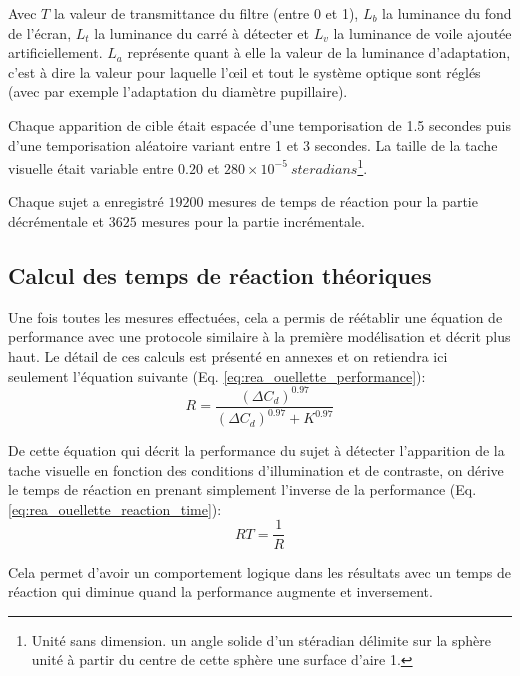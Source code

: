 	\par Avec $T$ la valeur de transmittance du filtre (entre 0 et 1), $L_b$ la luminance du fond de l'écran, $L_t$ la luminance du carré à détecter et $L_v$ la luminance de voile ajoutée artificiellement. $L_a$ représente quant à elle la valeur de la luminance d'adaptation, c'est à dire la valeur pour laquelle l'œil et tout le système optique sont réglés (avec par exemple l'adaptation du diamètre pupillaire).
	
	\par Chaque apparition de cible était espacée d'une temporisation de 1.5 secondes puis d'une temporisation aléatoire variant entre 1 et 3 secondes. La taille de la tache visuelle était variable entre $0.20$ et $280 \times 10^{-5}~steradians$\footnote{Unité sans dimension. un angle solide d'un stéradian délimite sur la sphère unité à partir du centre de cette sphère une surface d'aire 1.}.
	
	\par Chaque sujet a enregistré $19200$ mesures de temps de réaction pour la partie décrémentale et $3625$ mesures pour la partie incrémentale.
	
	\subsection{Calcul des temps de réaction théoriques}
	\par Une fois toutes les mesures effectuées, cela a permis de réétablir une équation de performance avec une protocole similaire à la première modélisation et décrit plus haut. Le détail de ces calculs est présenté en annexes et on retiendra ici seulement l'équation suivante (Eq. \ref{eq:rea_ouellette_performance}):
	\begin{equation}
		R = \frac{(\Delta C_d)^{0.97}}{(\Delta C_d)^{0.97} + K^{0.97}}
		\label{eq:rea_ouellette_performance}
	\end{equation}
	
	\par De cette équation qui décrit la performance du sujet à détecter l'apparition de la tache visuelle en fonction des conditions d'illumination et de contraste, on dérive le temps de réaction en prenant simplement l'inverse de la performance (Eq. \ref{eq:rea_ouellette_reaction_time}):
	\begin{equation}
		RT = \frac{1}{R}
		\label{eq:rea_ouellette_reaction_time}
	\end{equation}
	
	\par Cela permet d'avoir un comportement logique dans les résultats avec un temps de réaction qui diminue quand la performance augmente et inversement.
	
